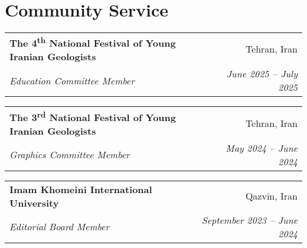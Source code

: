 \documentclass[letterpaper,11pt]{article}
\makeatletter
\newcommand{\ressubheading}[4]{%
	\begin{tabular*}{\textwidth}{l@{\cftdotfill{\cftsecdotsep}\extracolsep{\fill}}r}
		\textbf{#1} & #2 \\
		\textit{#3} & \textit{#4} \\
	\end{tabular*}\vspace{-8pt}
}
\makeatother
\begin{document}

	\section{Community Service}
	\vspace{-0.9em} 
	\ressubheading{The 4\textsuperscript{th} National Festival of Young Iranian Geologists}{Tehran, Iran}{Education Committee Member}{June 2025 – July 2025}

			\vspace{0.3em} 
	\ressubheading{The 3\textsuperscript{rd} National Festival of Young Iranian Geologists}{Tehran, Iran}{Graphics Committee Member}{May 2024 – June 2024}

			\vspace{0.3em} 
	\ressubheading{Imam Khomeini International University}{Qazvin, Iran}{Editorial Board Member}{September 2023 – June 2024}
	
	\vspace{-1.5em} 
	
	
\end{document}
